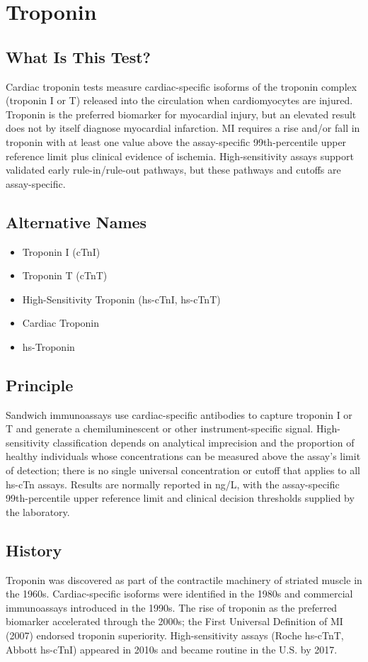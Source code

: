 \chapter{Troponin}

\section*{What Is This Test?}
Cardiac troponin tests measure cardiac-specific isoforms of the troponin complex (troponin I or T) released into the circulation when cardiomyocytes are injured. Troponin is the preferred biomarker for myocardial injury, but an elevated result does not by itself diagnose myocardial infarction. MI requires a rise and/or fall in troponin with at least one value above the assay-specific 99th-percentile upper reference limit plus clinical evidence of ischemia. High-sensitivity assays support validated early rule-in/rule-out pathways, but these pathways and cutoffs are assay-specific.

\section*{Alternative Names}
\begin{itemize}
  \item Troponin I (cTnI)
  \item Troponin T (cTnT)
  \item High-Sensitivity Troponin (hs-cTnI, hs-cTnT)
  \item Cardiac Troponin
  \item hs-Troponin
\end{itemize}
\section*{Principle}
Sandwich immunoassays use cardiac-specific antibodies to capture troponin I or T and generate a chemiluminescent or other instrument-specific signal. High-sensitivity classification depends on analytical imprecision and the proportion of healthy individuals whose concentrations can be measured above the assay's limit of detection; there is no single universal concentration or cutoff that applies to all hs-cTn assays. Results are normally reported in ng/L, with the assay-specific 99th-percentile upper reference limit and clinical decision thresholds supplied by the laboratory.

\section*{History}
Troponin was discovered as part of the contractile machinery of striated muscle in the 1960s. Cardiac-specific isoforms were identified in the 1980s and commercial immunoassays introduced in the 1990s. The rise of troponin as the preferred biomarker accelerated through the 2000s; the First Universal Definition of MI (2007) endorsed troponin superiority. High-sensitivity assays (Roche hs-cTnT, Abbott hs-cTnI) appeared in 2010s and became routine in the U.S. by 2017.

